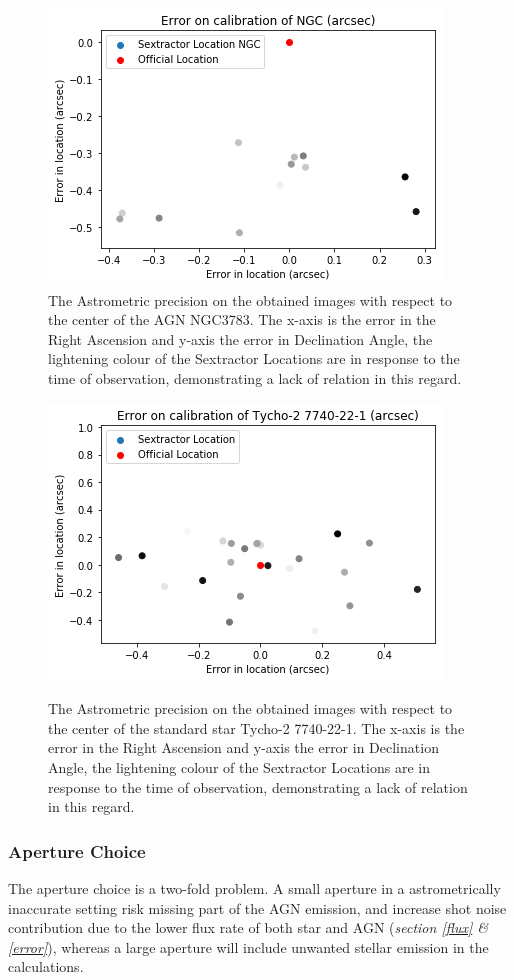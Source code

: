 \documentclass[a4paper, 12pt, twoside]{article}
\begin{document}
\begin{figure}[htp!]
\centering
\includegraphics[width=0.7\linewidth]{Figure/Astrometry_NGC3783.png}\\
\caption{The Astrometric precision on the obtained images with respect to the center of the AGN NGC3783. The x-axis is the error in the Right Ascension and y-axis the error in Declination Angle, the lightening colour of the Sextractor Locations are in response to the time of observation, demonstrating a lack of relation in this regard.}
\label{fig:Astrometry_NGC7213}

\centering
\includegraphics[width=0.7\linewidth]{Figure/Astrometry_Tycho-22-1.png}\\
\caption{The Astrometric precision on the obtained images with respect to the center of the standard star Tycho-2 7740-22-1. The x-axis is the error in the Right Ascension and y-axis the error in Declination Angle, the lightening colour of the Sextractor Locations are in response to the time of observation, demonstrating a lack of relation in this regard.}
\label{fig:Astrometry_Tycho-22-1}
\end{figure}

\subsubsection{Aperture Choice}
The aperture choice is a two-fold problem. A small aperture in a astrometrically inaccurate setting risk missing part of the AGN emission, and increase shot noise contribution due to the lower flux rate of both star and AGN (\emph{section \ref{flux} \& \ref{error}}), whereas a large aperture will include unwanted stellar emission in the calculations. 
\end{document}
